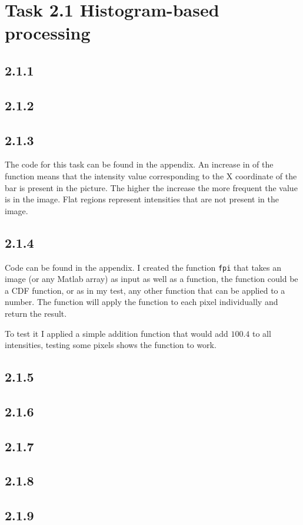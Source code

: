 \section{Task 2.1 Histogram-based processing}

\subsection{2.1.1}
\subsection{2.1.2}

\subsection{2.1.3}
The code for this task can be found in the appendix. An increase in of the function means that the
intensity value corresponding to the X coordinate of the bar is present in the picture. The higher
the increase the more frequent the value is in the image. Flat regions represent intensities that
are not present in the image.


\subsection{2.1.4}
Code can be found in the appendix. I created the function \texttt{fpi} that takes an image (or any
Matlab array) as input as well as a function, the function could be a CDF function, or as in my
test, any other function that can be applied to a number. The function will apply the function to
each pixel individually and return the result.

To test it I applied a simple addition function that would add $100.4$ to all intensities, testing
some pixels shows the function to work.


\subsection{2.1.5}
\subsection{2.1.6}
\subsection{2.1.7}
\subsection{2.1.8}
\subsection{2.1.9}